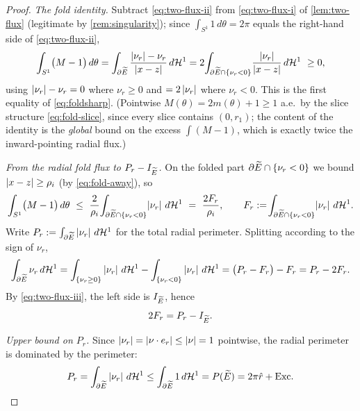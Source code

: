 \begin{proof}
\emph{The fold identity.}
Subtract \eqref{eq:two-flux-ii} from \eqref{eq:two-flux-i} of
\cref{lem:two-flux} (legitimate by \cref{rem:singularity}); since
$\int_{S^1}1\,d\theta=2\pi$ equals the right-hand side of
\eqref{eq:two-flux-ii},
\[
   \int_{S^1}\bigl(M-1\bigr)\,d\theta
   =\int_{\partial\widetilde{E}}\frac{\left\lvert\nu_r\right\rvert-\nu_r}{\left\lvert x-z\right\rvert}\,d\mathcal{H}^1
   =2\!\int_{\partial\widetilde{E}\cap\{\nu_r<0\}}\!
       \frac{\left\lvert\nu_r\right\rvert}{\left\lvert x-z\right\rvert}\,d\mathcal{H}^1\ \ge0,
\]
using $\left\lvert\nu_r\right\rvert-\nu_r=0$ where $\nu_r\ge0$ and $=2\left\lvert\nu_r\right\rvert$ where
$\nu_r<0$. This is the first equality of \eqref{eq:foldsharp}. (Pointwise
$M(\theta)=2m(\theta)+1\ge1$ a.e.\ by the slice structure
\eqref{eq:fold-slice}, since every slice contains $(0,r_1)$; the content of
the identity is the \emph{global} bound on the excess $\int(M-1)$, which is
exactly twice the inward-pointing radial flux.)

\emph{From the radial fold flux to $P_r-I_{\widetilde{E}}$.}
On the folded part $\partial\widetilde{E}\cap\{\nu_r<0\}$ we bound
$\left\lvert x-z\right\rvert\ge\rho_i$ (by \eqref{eq:fold-away}), so
\begin{equation}\label{eq:fold-step1}
   \int_{S^1}\bigl(M-1\bigr)\,d\theta
   \ \le\ \frac2{\rho_i}\!\int_{\partial\widetilde{E}\cap\{\nu_r<0\}}\!
          \left\lvert\nu_r\right\rvert\,d\mathcal{H}^1
   \ =\ \frac{2F_r}{\rho_i},\qquad
   F_r:=\!\int_{\partial\widetilde{E}\cap\{\nu_r<0\}}\!\left\lvert\nu_r\right\rvert\,d\mathcal{H}^1 .
\end{equation}
Write $P_r:=\int_{\partial\widetilde{E}}\left\lvert\nu_r\right\rvert\,d\mathcal{H}^1$ for the total radial
perimeter. Splitting according to the sign of $\nu_r$,
\[
   \int_{\partial\widetilde{E}}\nu_r\,d\mathcal{H}^1
   =\int_{\{\nu_r\ge0\}}\left\lvert\nu_r\right\rvert\,d\mathcal{H}^1
    -\int_{\{\nu_r<0\}}\left\lvert\nu_r\right\rvert\,d\mathcal{H}^1
   =\bigl(P_r-F_r\bigr)-F_r=P_r-2F_r .
\]
By \eqref{eq:two-flux-iii}, the left side is $I_{\widetilde{E}}$, hence
\begin{equation}\label{eq:fold-Fr}
   2F_r=P_r-I_{\widetilde{E}} .
\end{equation}

\emph{Upper bound on $P_r$.}
Since $\left\lvert\nu_r\right\rvert=\left\lvert\nu\cdot e_r\right\rvert\le\left\lvert\nu\right\rvert=1$ pointwise, the radial
perimeter is dominated by the perimeter:
\[
   P_r=\int_{\partial\widetilde{E}}\left\lvert\nu_r\right\rvert\,d\mathcal{H}^1
   \le\int_{\partial\widetilde{E}}1\,d\mathcal{H}^1=P(\widetilde{E})=2\pi\hat r+\mathrm{Exc} .
\]


\end{proof}
